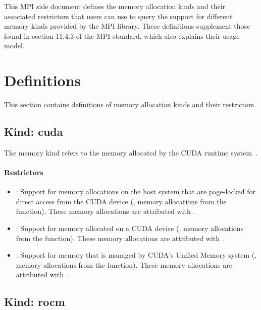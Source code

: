 This MPI side document defines the memory allocation kinds and their
associated restrictors that users can use to query the support for
different memory kinds provided by the MPI library. These definitions
supplement those found in section 11.4.3 of the MPI standard, which
also explains their usage model. 

\chapter{Definitions}

This section contains definitions of memory allocation kinds and
their restrictors.

\section{Kind: cuda}

The  memory kind refers to the memory allocated by the
CUDA runtime system~\cite{cudaref}.

\subsubsection{Restrictors}

\begin{itemize}

\item {}: Support for memory allocations on the host system
    that are page-locked for direct access from the CUDA device (\eg,
        memory allocations from the  function).
        These memory allocations are attributed with .

\item {}: Support for memory allocated on a CUDA device
    (\eg, memory allocations from the  function).
        These memory allocations are attributed with .

\item {}: Support for memory that is managed by CUDA’s
    Unified Memory system (\eg, memory allocations from the
         function).
        These memory allocations are attributed with .

\end{itemize}

\section{Kind: rocm}

